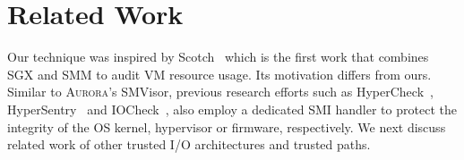 \documentclass[journal,twocolumn,letterpaper,10pt]{IEEEtran}
\begin{document}
%

\section{Related Work}
Our technique was inspired by Scotch~\cite{DBLP:conf/raid/LeachZW17} which is the first work that combines SGX and SMM to audit VM resource usage. Its motivation differs from ours.
Similar to \textsc{Aurora}'s SMVisor, previous research efforts such as HyperCheck~\cite{DBLP:conf/raid/WangSG10}, HyperSentry~\cite{DBLP:conf/ccs/AzabNWJZS10} and IOCheck~\cite{DBLP:conf/esorics/ZhangWLS14}, also employ a dedicated SMI handler to protect the integrity of the OS kernel, hypervisor or firmware, respectively.
We next discuss related work of other trusted I/O architectures and trusted paths.
\end{document}

